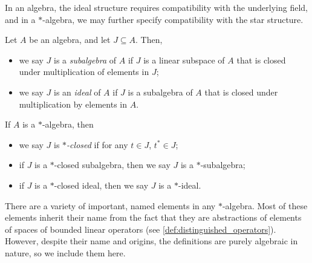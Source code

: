 In an algebra, the ideal structure requires compatibility with the underlying field, and in a $\ast$-algebra, we may further specify compatibility with the star structure.
\begin{definition}
  Let $A$ be an algebra, and let $J\subseteq A$. Then,
  \begin{itemize}
    \item we say $J$ is a \textit{subalgebra} of $A$ if $J$ is a linear subspace of $A$ that is closed under multiplication of elements in $J$;
    \item we say $J$ is an \textit{ideal} of $A$ if $J$ is a subalgebra of $A$ that is closed under multiplication by elements in $A$.
  \end{itemize}
  If $A$ is a $\ast$-algebra, then
  \begin{itemize}
    \item we say $J$ is \textit{$\ast$-closed} if for any $t\in J$, $t^{\ast}\in J$;
    \item if $J$ is a $\ast$-closed subalgebra, then we say $J$ is a $\ast$-subalgebra;
    \item if $J$ is a $\ast$-closed ideal, then we say $J$ is a $\ast$-ideal.
  \end{itemize}
\end{definition}
There are a variety of important, named elements in any $\ast$-algebra. Most of these elements inherit their name from the fact that they are abstractions of elements of spaces of bounded linear operators (see \ref{def:distinguished_operators}). However, despite their name and origins, the definitions are purely algebraic in nature, so we include them here.
